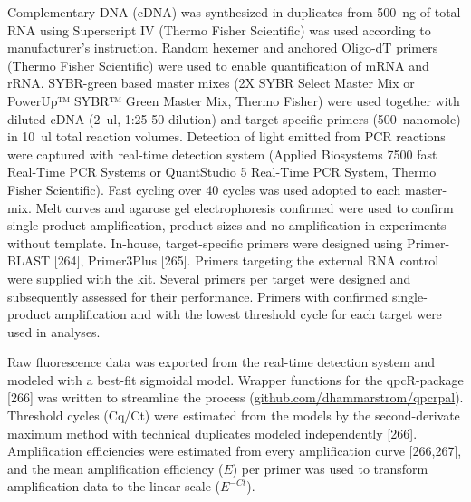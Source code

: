 \documentclass[twoside,10pt]{gihclass} %
\begin{document}
Complementary DNA (cDNA) was synthesized in duplicates from \SI{500}{ng} of total RNA using Superscript IV (Thermo Fisher Scientific) was used according to manufacturer's instruction. Random hexemer and anchored Oligo-dT primers (Thermo Fisher Scientific) were used to enable quantification of mRNA and rRNA.
SYBR-green based master mixes (2X SYBR Select Master Mix or PowerUp™ SYBR™ Green Master Mix, Thermo Fisher) were used together with diluted cDNA (\SI{2}{ul}, 1:25-50 dilution) and target-specific primers (\SI{500}{nanomole}) in \SI{10}{ul} total reaction volumes. Detection of light emitted from PCR reactions were captured with real-time detection system (Applied Biosystems 7500 fast Real-Time PCR Systems or QuantStudio 5 Real-Time PCR System, Thermo Fisher Scientific). Fast cycling over 40 cycles was used adopted to each master-mix. Melt curves and agarose gel electrophoresis confirmed were used to confirm single product amplification, product sizes and no amplification in experiments without template.
In-house, target-specific primers were designed using Primer-BLAST {[}264{]}, Primer3Plus {[}265{]}. Primers targeting the external RNA control were supplied with the kit. Several primers per target were designed and subsequently assessed for their performance. Primers with confirmed single-product amplification and with the lowest threshold cycle for each target were used in analyses.

Raw fluorescence data was exported from the real-time detection system and modeled with a best-fit sigmoidal model.
Wrapper functions for the qpcR-package {[}266{]} was written to streamline the process
(\href{http://www.github.com/dhammarstrom/qpcrpal}{github.com/dhammarstrom/qpcrpal}).
Threshold cycles (Cq/Ct) were estimated from the models by the second-derivate maximum method with technical duplicates modeled independently {[}266{]}.
Amplification efficiencies were estimated from every amplification curve
{[}266,267{]},
and the mean amplification efficiency (\(E\)) per primer was used to transform amplification data to the linear scale (\(E^{-Ct}\)).
\end{document}
